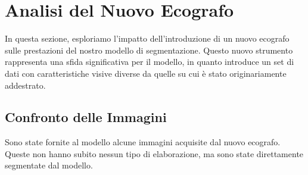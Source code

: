 \section{Analisi del Nuovo Ecografo}
\label{sec:analisi_nuovo_ecografo}

In questa sezione, esploriamo l'impatto dell'introduzione di un nuovo ecografo sulle prestazioni del
nostro modello di segmentazione. Questo nuovo strumento rappresenta una sfida significativa per il
modello, in quanto introduce un set di dati con caratteristiche visive diverse da quelle su cui è
stato originariamente addestrato.

\subsection{Confronto delle Immagini}
\label{subsec:confronto_immagini}

Sono state fornite al modello alcune immagini acquisite dal nuovo ecografo. Queste non hanno subito
nessun tipo di elaborazione, ma sono state direttamente segmentate dal modello.


